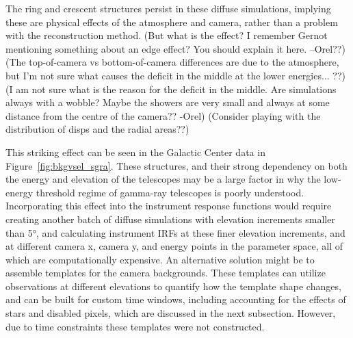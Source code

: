     The ring and crescent structures persist in these diffuse simulations, implying these are physical effects of the atmosphere and camera, rather than a problem with the reconstruction method.
    {\color{red}(But what is the effect? I remember Gernot mentioning something about an edge effect? You should explain it here. --Orel??)}
    {\color{red}(The top-of-camera vs bottom-of-camera differences are due to the atmosphere, but I'm not sure what causes the deficit in the middle at the lower energies... ??)}
    {\color{red}(I am not sure what is the reason for the deficit in the middle. Are simulations always with a wobble? Maybe the showers are very small and always at some distance from the centre of the camera?? -Orel)}
    {\color{red}(Consider playing with the distribution of disps and the radial areas??)}

    This striking effect can be seen in the Galactic Center data in Figure~\ref{fig:bkgvsel_sgra}.
    These structures, and their strong dependency on both the energy and elevation of the telescopes may be a large factor in why the low-energy threshold regime of gamma-ray telescopes is poorly understood.
    Incorporating this effect into the instrument response functions would require creating another batch of diffuse simulations with elevation increments smaller than \ang{5}, and calculating instrument IRFs at these finer elevation increments, and at different camera x, camera y, and energy points in the parameter space, all of which are computationally expensive.
    An alternative solution might be to assemble templates for the camera backgrounds.
    These templates can utilize observations at different elevations to quantify how the template shape changes, and can be built for custom time windows, including accounting for the effects of stars and disabled pixels, which are discussed in the next subsection.
    However, due to time constraints these templates were not constructed.
    
